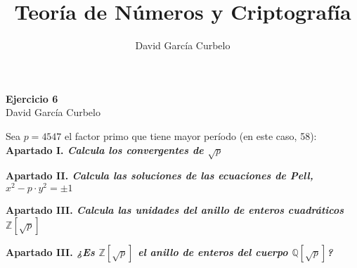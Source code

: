 \documentclass[fleqn]{article}
\author{David García Curbelo}
\title{Teoría de Números y Criptografía}
\def\Z{\mathds{Z}}
\def\Q{\mathds{Q}}
\begin{document}
    \begin{center}
        \LARGE{\textbf{Ejercicio 6}} \\
        \Large{David García Curbelo} \\
    \end{center}

    \vspace{1cm}
    
    Sea $p = 4547$ el factor primo que tiene mayor período (en este caso, 58): \\ 


    \textbf{Apartado I. \textit{Calcula los convergentes de $\sqrt{p}$}} 

    \newpage
    \textbf{Apartado II. \textit{Calcula las soluciones de las ecuaciones de Pell, $x^2 - p \cdot y^2 = \pm 1$}}


    \newpage
    \textbf{Apartado III. \textit{Calcula las unidades del anillo de enteros cuadráticos $\Z[\sqrt{p}]$}}


    \newpage
    \textbf{Apartado III. \textit{¿Es $\Z[\sqrt{p}]$ el anillo de enteros del cuerpo $\Q[\sqrt{p}]$?}}
\end{document}
